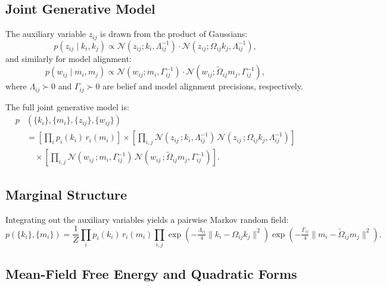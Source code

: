 \documentclass[twoside,11pt]{article}
\begin{document}
\subsection{Joint Generative Model}

The auxiliary variable $z_{ij}$ is drawn from the product of Gaussians:
\begin{equation}
p(z_{ij} \mid k_i, k_j) \propto
\mathcal{N}(z_{ij}; k_i, \Lambda_{ij}^{-1}) \cdot
\mathcal{N}(z_{ij}; \Omega_{ij}k_j, \Lambda_{ij}^{-1}),
\label{eq:belief_coupling_product}
\end{equation}
and similarly for model alignment:
\begin{equation}
p(w_{ij} \mid m_i, m_j) \propto
\mathcal{N}(w_{ij}; m_i, \Gamma_{ij}^{-1}) \cdot
\mathcal{N}(w_{ij}; \tilde{\Omega}_{ij}m_j, \Gamma_{ij}^{-1}),
\label{eq:model_coupling_product}
\end{equation}
where $\Lambda_{ij} \succ 0$ and $\Gamma_{ij} \succ 0$ are belief and model alignment precisions, respectively.

The full joint generative model is:
\begin{equation}
\begin{aligned}
p&(\{k_i\},\{m_i\},\{z_{ij}\},\{w_{ij}\})\\
&=\left[\prod_i p_i(k_i)\,r_i(m_i)\right]
\times
\left[\prod_{i,j}
\mathcal{N}(z_{ij}\,;k_i,\Lambda_{ij}^{-1})
\,\mathcal{N}(z_{ij}\,;\Omega_{ij}k_j,\Lambda_{ij}^{-1})\right]\\
&\quad\times
\left[\prod_{i,j}
\mathcal{N}(w_{ij}\,;m_i,\Gamma_{ij}^{-1})
\,\mathcal{N}(w_{ij}\,;\tilde{\Omega}_{ij}m_j,\Gamma_{ij}^{-1})\right].
\end{aligned}
\label{eq:joint_distribution}
\end{equation}

\subsection{Marginal Structure}
\label{sec:marginal_mrf}

Integrating out the auxiliary variables yields a pairwise Markov random field:
\begin{equation}
p(\{k_i\},\{m_i\}) = \frac{1}{Z}\prod_i p_i(k_i)\,r_i(m_i)
\prod_{i,j} \exp\!\left(-\tfrac{\Lambda_{ij}}{4}\|k_i - \Omega_{ij}k_j\|^2\right)
\exp\!\left(-\tfrac{\Gamma_{ij}}{4}\|m_i - \tilde{\Omega}_{ij}m_j\|^2\right).
\label{eq:marginal_mrf}
\end{equation}

\subsection{Mean-Field Free Energy and Quadratic Forms}
\end{document}
